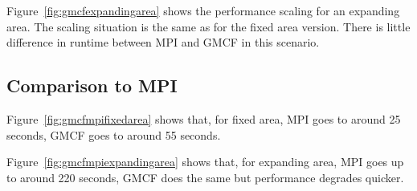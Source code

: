 Figure~\ref{fig:gmcfexpandingarea} shows the performance scaling for an
expanding area. The scaling situation is the same as for the fixed area version.
There is little difference in runtime between MPI and GMCF in this scenario.

\subsection{Comparison to MPI}

Figure~\ref{fig:gmcfmpifixedarea} shows that, for fixed area, MPI goes to around
25 seconds, GMCF goes to around 55 seconds.

Figure~\ref{fig:gmcfmpiexpandingarea} shows that, for expanding area, MPI goes
up to around 220 seconds, GMCF does the same but performance degrades quicker.
